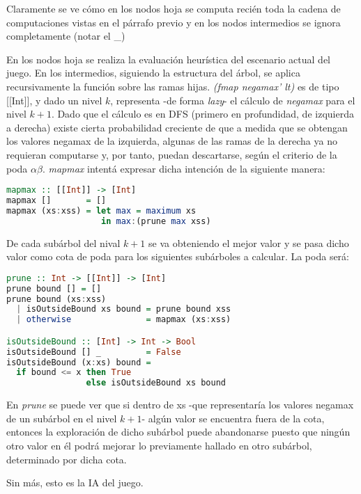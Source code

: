 \documentclass{llncs}
\begin{document}
Claramente se ve cómo en los nodos hoja se computa recién toda la cadena de computaciones vistas en el párrafo previo y  en los nodos intermedios se ignora completamente (notar el \_)

En los nodos hoja se realiza la evaluación heurística del escenario actual del juego. En los intermedios, siguiendo la estructura del árbol, se aplica recursivamente la función sobre las ramas hijas. \textit{(fmap negamax' lt)} es de tipo [[Int]], y dado un nivel $k$, representa -de forma \textit{lazy}-  el cálculo de \textit{negamax} para el nivel $k+1$. Dado que el cálculo es en DFS (primero en profundidad, de izquierda a derecha) existe cierta probabilidad creciente de que a medida que se obtengan los valores negamax de la izquierda, algunas de las ramas de la derecha ya no requieran computarse y, por tanto, puedan descartarse, según el criterio de la poda $\alpha\beta$. \textit{mapmax} intentá expresar dicha intención de la siguiente manera:

\begin{lstlisting}[frame=single, language=haskell, captionpos=b, caption=Definición de mapmax]
mapmax :: [[Int]] -> [Int]
mapmax []       = []
mapmax (xs:xss) = let max = maximum xs
                   in max:(prune max xss)
\end{lstlisting}

De cada subárbol del nival $k+1$ se va obteniendo el mejor valor y se pasa dicho valor como cota de poda para los siguientes subárboles a calcular. La poda será:

\begin{lstlisting}[frame=single, language=haskell, captionpos=b, caption=Definición de prune]
prune :: Int -> [[Int]] -> [Int]
prune bound [] = []
prune bound (xs:xss)
  | isOutsideBound xs bound = prune bound xss
  | otherwise               = mapmax (xs:xss)

isOutsideBound :: [Int] -> Int -> Bool
isOutsideBound [] _         = False
isOutsideBound (x:xs) bound =
  if bound <= x then True
                else isOutsideBound xs bound
\end{lstlisting}

En \textit{prune} se puede ver que si dentro de xs -que representaría los valores negamax de un subárbol en el nivel $k+1$- algún valor se encuentra fuera de la cota, entonces la exploración de dicho subárbol puede abandonarse puesto que ningún otro valor en él podrá mejorar lo previamente hallado en otro subárbol, determinado por dicha cota.

Sin más, esto es la IA del juego.
\end{document}
